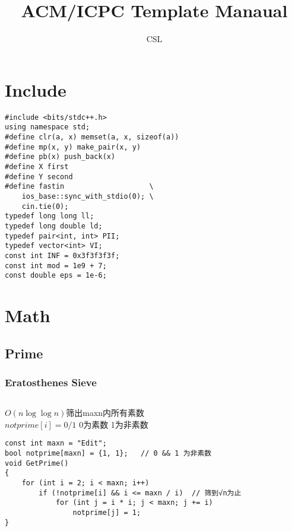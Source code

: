 \documentclass[twoside]{article}
\title{ACM/ICPC Template Manaual}
\author{CSL}
\begin{document}
\small
\begin{titlepage}
\maketitle\setcounter{page}{0}\thispagestyle{empty}\clearpage
\tableofcontents\clearpage
\end{titlepage}
\pagestyle{fancy}
\lfoot{}
\cfoot{\thepage}\rfoot{}
\setcounter{section}{-1}
\setcounter{page}{1}
\clearpage\section{Include}
\begin{lstlisting}
#include <bits/stdc++.h>
using namespace std;
#define clr(a, x) memset(a, x, sizeof(a))
#define mp(x, y) make_pair(x, y)
#define pb(x) push_back(x)
#define X first
#define Y second
#define fastin                    \
    ios_base::sync_with_stdio(0); \
    cin.tie(0);
typedef long long ll;
typedef long double ld;
typedef pair<int, int> PII;
typedef vector<int> VI;
const int INF = 0x3f3f3f3f;
const int mod = 1e9 + 7;
const double eps = 1e-6;
\end{lstlisting}
\clearpage\section{Math}
\subsection{Prime}
\subsubsection{Eratosthenes Sieve}
\begin{lstlisting}
\end{lstlisting}
$O(n\log\log n)$筛出maxn内所有素数\\
$notprime[i] = 0/1$ 0为素数 1为非素数\\
\begin{lstlisting}
const int maxn = "Edit";
bool notprime[maxn] = {1, 1};   // 0 && 1 为非素数
void GetPrime()
{
    for (int i = 2; i < maxn; i++)
        if (!notprime[i] && i <= maxn / i)  // 筛到√n为止
            for (int j = i * i; j < maxn; j += i)
                notprime[j] = 1;
}
\end{lstlisting}
\end{document}
